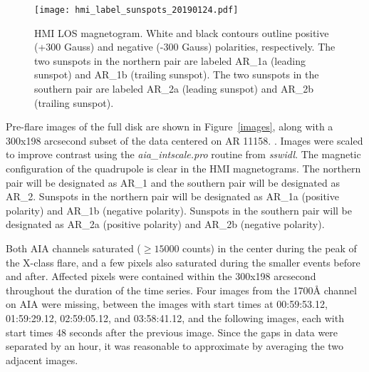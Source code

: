 \begin{figure}[htb!]\centering
    \texttt{[image: hmi\_label\_sunspots\_20190124.pdf]}
    \caption{
        HMI LOS magnetogram.
        White and black contours outline positive (+300 Gauss)
        and negative (-300 Gauss) polarities, respectively.
        The two sunspots in the northern pair are labeled AR\_1a (leading sunspot)
        and AR\_1b (trailing sunspot).
        The two sunspots in the southern pair are labeled AR\_2a (leading sunspot)
        and AR\_2b (trailing sunspot).
        \label{label}}
\end{figure}

Pre-flare images of the full disk are shown in Figure~\ref{images},
along with a 300x198 arcsecond subset of the data centered on AR 11158.
\citep{McAteer2003,McAteer2004}.
Images were scaled to improve contrast using the
\textit{aia\_intscale.pro} routine from \textit{sswidl}.
The magnetic configuration of the quadrupole is clear in the HMI magnetograms.
The northern pair will be designated as AR\_1
and the southern pair will be designated as AR\_2.
Sunspots in the northern pair will be designated as AR\_1a (positive polarity)
and AR\_1b (negative polarity).
Sunspots in the southern pair will be designated as AR\_2a (positive polarity)
and AR\_2b (negative polarity).

Both AIA channels saturated ($\geq\!15000$ counts) in the center
during the peak of the X-class flare, and a few pixels also saturated
during the smaller events before and after.
Affected pixels were  contained within the
300x198 arcsecond 
throughout the duration of the time series.
Four images from the 1700\AA{} channel on AIA were missing, between
the images with start times at
00:59:53.12,
01:59:29.12,
02:59:05.12, and
03:58:41.12, and the following images, each with start times
48 seconds after the previous image.
Since the gaps in data were separated by an hour,
it was reasonable to approximate 
by averaging the two adjacent images.
